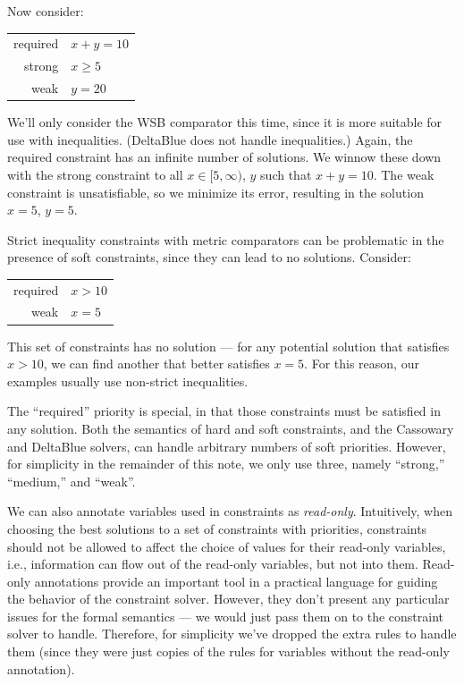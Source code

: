 \documentclass{article}
\begin{document}
Now consider:

\begin{tabular}{rl}
required & $x+y=10$ \\
strong   & $x \geq 5$ \\
weak     & $y=20$
\end{tabular}

We'll only consider the WSB comparator this time, since it is more
suitable for use with inequalities.  (DeltaBlue does not handle inequalities.)
Again, the required constraint has an infinite number of solutions.
We winnow these down with the strong constraint to all $x \in
[5,\infty)$, $y$ such that $x+y=10$.   The weak constraint is
  unsatisfiable, so we minimize its error, resulting in the solution
  $x=5$, $y=5$.

Strict inequality constraints with metric comparators can be
problematic in the presence of soft constraints, since they can lead
to no solutions.  Consider:

\begin{tabular}{rl}
required & $x>10$ \\
weak     & $x=5$
\end{tabular}

This set of constraints has no solution --- for any potential solution
that satisfies $x>10$, we can find another that better satisfies
$x=5$.  For this reason, our examples usually use non-strict
inequalities. 

The ``required'' priority is special, in that those constraints must
be satisfied in any solution.  Both the semantics of hard and soft
constraints, and the Cassowary and DeltaBlue solvers, can handle
arbitrary numbers of soft priorities.  However, for simplicity in the
remainder of this note, we only use three, namely ``strong,''
``medium,'' and ``weak''.

We can also annotate variables used in constraints as
\emph{read-only}.  Intuitively, when choosing the best solutions to a
set of constraints with priorities, constraints should not be allowed
to affect the choice of values for their read-only variables, i.e.,
information can flow out of the read-only variables, but not into
them.  Read-only annotations provide an important tool in a practical
language for guiding the behavior of the constraint solver.  However,
they don't present any particular issues for the formal semantics ---
we would just pass them on to the constraint solver to handle.
Therefore, for simplicity we've dropped the extra rules to handle them
(since they were just copies of the rules for variables without the
read-only annotation).
\end{document}
